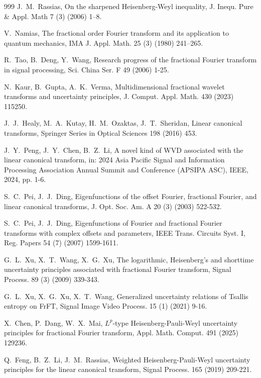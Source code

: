 \documentclass[preprint,12pt]{elsarticle}
\begin{document}
\begin{thebibliography}{999}
	J.~M.~Rassias, On the sharpened Heisenberg-Weyl inequality, J. Inequ. Pure \& Appl. Math 7 (3) (2006) 1–8.
	
	
	V.~Namias, The fractional order Fourier transform and its application to quantum mechanics, IMA J. Appl. Math. 25 (3) (1980) 241–265.
	
	R.~Tao, B.~Deng, Y.~Wang, Research progress of the fractional Fourier transform in signal processing, Sci. China Ser. F 49 (2006) 1-25.
	
	N.~Kaur, B.~Gupta, A.~K.~Verma, Multidimensional fractional wavelet transforms and uncertainty principles, J. Comput. Appl. Math. 430 (2023) 115250.
	
	J.~J.~Healy, M.~A.~Kutay, H.~M.~Ozaktas, J.~T.~Sheridan, Linear canonical transforms, Springer Series in Optical Sciences 198 (2016) 453.
	
	J.~Y.~Peng, J.~Y.~Chen, B.~Z.~Li, A novel kind of WVD associated with the linear canonical transform, in: 2024 Asia Pacific Signal and Information Processing Association Annual Summit and Conference (APSIPA ASC), IEEE, 2024, pp. 1-6.
	
	S.~C.~Pei, J.~J.~Ding, Eigenfunctions of the offset Fourier, fractional Fourier, and linear canonical transforms, J. Opt. Soc. Am. A 20 (3) (2003) 522-532.
	
	S.~C.~Pei, J.~J.~Ding, Eigenfunctions of Fourier and fractional Fourier transforms with complex offsets and parameters, IEEE Trans. Circuits Syst. I, Reg. Papers 54 (7) (2007) 1599-1611.
	
	G.~L.~Xu, X.~T.~Wang, X.~G.~Xu, The logarithmic, Heisenberg’s and shorttime uncertainty principles associated with fractional Fourier transform, Signal Process. 89 (3) (2009) 339-343.
	
	G.~L.~Xu, X.~G.~Xu, X.~T.~Wang, Generalized uncertainty relations of Tsallis entropy on FrFT, Signal Image Video Process. 15 (1) (2021) 9-16.
	
	X.~Chen, P.~Dang, W.~X.~Mai, $L^{p}$-type Heisenberg-Pauli-Weyl uncertainty principles for fractional Fourier transform, Appl. Math. Comput. 491 (2025) 129236.
	
	Q.~Feng, B.~Z.~Li, J.~M.~Rassias, Weighted Heisenberg-Pauli-Weyl uncertainty principles for the linear canonical transform, Signal Process. 165 (2019) 209-221.
	

\end{thebibliography}
\end{document}
